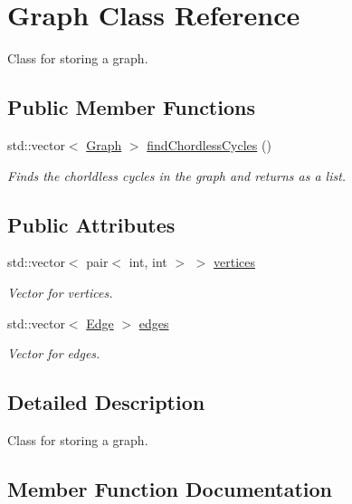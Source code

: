\hypertarget{class_graph}{}\section{Graph Class Reference}
\label{class_graph}


Class for storing a graph.  


\subsection*{Public Member Functions}
\begin{DoxyCompactItemize}
\item 
std\+::vector$<$ \mbox{\hyperlink{class_graph}{Graph}} $>$ \mbox{\hyperlink{class_graph_aef4f749f0b65ba4ca9834f0a64150f09}{find\+Chordless\+Cycles}} ()
\begin{DoxyCompactList}\small\item\em Finds the chorldless cycles in the graph and returns as a list. \end{DoxyCompactList}\end{DoxyCompactItemize}
\subsection*{Public Attributes}
\begin{DoxyCompactItemize}
\item 
std\+::vector$<$ pair$<$ int, int $>$ $>$ \mbox{\hyperlink{class_graph_aa2eb1fa662b40441949fc7f0d0d2a3ad}{vertices}}
\begin{DoxyCompactList}\small\item\em Vector for vertices. \end{DoxyCompactList}\item 
std\+::vector$<$ \mbox{\hyperlink{struct_edge}{Edge}} $>$ \mbox{\hyperlink{class_graph_a28d19ea9c7d111f55fee78331abe88bd}{edges}}
\begin{DoxyCompactList}\small\item\em Vector for edges. \end{DoxyCompactList}\end{DoxyCompactItemize}


\subsection{Detailed Description}
Class for storing a graph. 

\subsection{Member Function Documentation}
\mbox{\label{class_graph_aef4f749f0b65ba4ca9834f0a64150f09}} 
